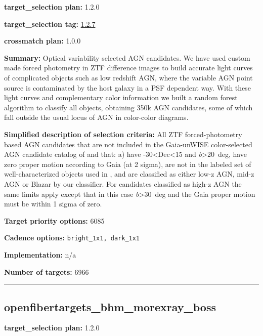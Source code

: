 \noindent\textbf{target\_selection plan:} 1.2.0

\noindent\textbf{target\_selection tag:}
\href{https://github.com/sdss/target_selection/tree/1.2.7/}{1.2.7}

\noindent\textbf{crossmatch plan:} 1.0.0

\noindent\textbf{Summary:} Optical variability selected AGN candidates. We have
used custom made forced photometry in ZTF difference images to build
accurate light curves of complicated objects such as low redshift AGN,
where the variable AGN point source is contaminated by the host galaxy
in a PSF dependent way. With these light curves and complementary color
information we built a random forest algorithm to classify all objects,
obtaining 350k AGN candidates, some of which fall outside the usual
locus of AGN in color-color diagrams.

\noindent\textbf{Simplified description of selection criteria:} All ZTF
forced-photometry based AGN candidates that are not included in the
Gaia-unWISE color-selected AGN candidate catalog of
\citet{Shu2019} and that: a) have -30\textless Dec\textless15 and
\textbar{}\emph{b}\textbar\textgreater20~deg, have zero proper motion
according to Gaia (at 2 sigma), are not in the labeled set of
well-characterized objects used in
\citealt{SanchezSaez2023}, and are classified as either low-z AGN, mid-z AGN or
Blazar by our classifier. For candidates classified as high-z AGN the
same limits apply except that in this case
\textbar{}\emph{b}\textbar\textgreater30~deg and the Gaia proper motion
must be within 1 sigma of zero.


\noindent\textbf{Target priority options:} 6085

\noindent\textbf{Cadence options:} \texttt{bright\_1x1,\ dark\_1x1}

\noindent\textbf{Implementation:} n/a

\noindent\textbf{Number of targets:} 6966

\begin{center}\rule{0.5\linewidth}{0.5pt}\end{center}

\hypertarget{openfibertargets_bhm_morexray_boss_plan1.2.0}{%
\subsection{openfibertargets\_bhm\_morexray\_boss}\label{openfibertargets_bhm_morexray_boss_plan1.2.0}}

\noindent\textbf{target\_selection plan:} 1.2.0

